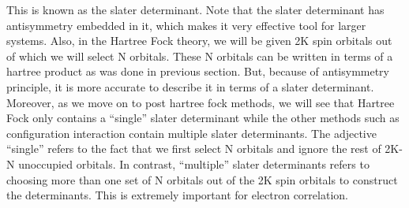 \documentclass{article}
\begin{document}
        This is known as the slater determinant. Note that the slater determinant
        has antisymmetry embedded in it, which makes it very effective tool for
        larger systems. Also, in the Hartree Fock theory, we will be given 2K
        spin orbitals out of which we will select N orbitals. These N orbitals can
        be written in terms of a hartree product as was done in previous section.
        But, because of antisymmetry principle, it is more accurate to
        describe it in terms of a slater determinant. Moreover, as we move on to
        post hartree fock methods, we will see that Hartree Fock only contains
        a ``single'' slater determinant while the other methods such as configuration
        interaction contain multiple slater determinants. The adjective ``single''
        refers to the fact that we first select N orbitals and ignore the rest
        of 2K-N unoccupied orbitals. In contrast, ``multiple'' slater determinants
        refers to choosing more than one set of N orbitals out of the 2K spin orbitals
        to construct the determinants. This is extremely important for electron correlation.
\end{document}
